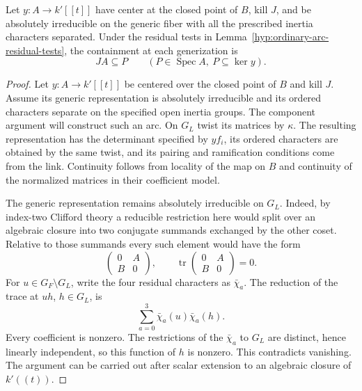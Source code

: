 \begin{proposition}\label{prop:tower-below-arc}
Let \(y:A\to k'[[t]]\) have center at the closed point of \(B\),
kill \(J\), and be absolutely irreducible on the generic fiber
with all the prescribed inertia characters separated. Under the residual tests in
Lemma~\ref{hyp:ordinary-arc-residual-tests}, the containment at each generization is 
\[
 JA\subseteq P\qquad(P\in\operatorname{Spec} A,\ P\subseteq\ker y).
\]

\end{proposition}

\begin{proof}
Let \(y:A\to k'[[t]]\) be centered over the closed point of
\(B\) and kill \(J\). Assume its generic representation
is absolutely irreducible and its ordered characters
separate on the specified open inertia groups. The component
argument will construct such an arc. On \(G_L\) twist its matrices by
\(\kappa\). The resulting representation has the determinant
specified by \(y f_i\), its ordered characters are obtained
by the same twist, and its pairing and ramification
conditions come from the link. Continuity follows from
locality of the map on \(B\) and continuity of the
normalized matrices in their coefficient model.


The generic representation remains absolutely irreducible
on \(G_L\). Indeed, by index-two Clifford theory a reducible restriction here would split over an algebraic closure into two conjugate summands exchanged by the other coset. Relative to those summands every such element would have the form
\[
 \begin{pmatrix}0&A\\ B&0\end{pmatrix},\qquad
 \operatorname{tr}\begin{pmatrix}0&A\\ B&0\end{pmatrix}=0 .
\] For \(u\in G_F\setminus G_L\), write the four residual
characters as \(\bar\chi_a\). The reduction of the trace
at \(uh\), \(h\in G_L\), is
\[
           \sum_{a=0}^3\bar\chi_a(u)\bar\chi_a(h).
\]
Every coefficient is nonzero. The restrictions of the
\(\bar\chi_a\) to \(G_L\) are distinct, hence linearly
independent, so this function of \(h\) is nonzero. This contradicts vanishing. The argument can be
carried out after scalar extension to an algebraic closure
of \(k'((t))\).


\end{proof}
